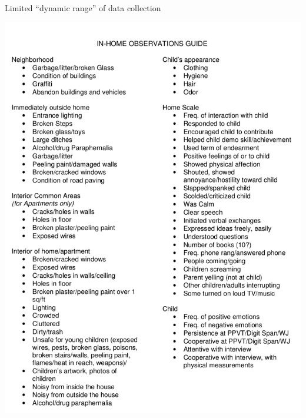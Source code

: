 \documentclass[aspectratio=169]{beamer}
\begin{document}
\begin{frame}

\begin{center}
{\Large Limited ``dynamic range'' of data collection}
\end{center}

\end{frame}
\begin{frame}

\begin{center}
\includegraphics[height = 0.8\textheight]{figures/y9_homevisit}
\end{center}

\end{frame}

\frame{\titlepage}
\end{document}
